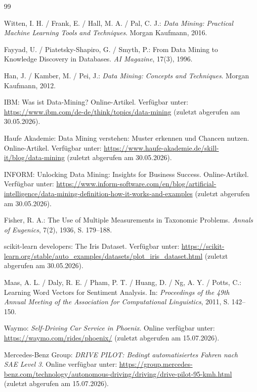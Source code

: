\documentclass[12pt,a4paper]{article}
\begin{document}
\begin{thebibliography}{99}

Witten, I. H. / Frank, E. / Hall, M. A. / Pal, C. J.:
\textit{Data Mining: Practical Machine Learning Tools and Techniques}.
Morgan Kaufmann, 2016.

Fayyad, U. / Piatetsky-Shapiro, G. / Smyth, P.:
From Data Mining to Knowledge Discovery in Databases.
\textit{AI Magazine}, 17(3), 1996.

Han, J. / Kamber, M. / Pei, J.:
\textit{Data Mining: Concepts and Techniques}.
Morgan Kaufmann, 2012.

IBM:
Was ist Data-Mining?
Online-Artikel.
Verfügbar unter:
\url{https://www.ibm.com/de-de/think/topics/data-mining}
(zuletzt abgerufen am 30.05.2026).

Haufe Akademie:
Data Mining verstehen: Muster erkennen und Chancen nutzen.
Online-Artikel.
Verfügbar unter:
\url{https://www.haufe-akademie.de/skill-it/blog/data-mining}
(zuletzt abgerufen am 30.05.2026).

INFORM:
Unlocking Data Mining: Insights for Business Success.
Online-Artikel.
Verfügbar unter:
\url{https://www.inform-software.com/en/blog/artificial-intelligence/data-mining-definition-how-it-works-and-examples}
(zuletzt abgerufen am 30.05.2026).

Fisher, R. A.:
The Use of Multiple Measurements in Taxonomic Problems.
\textit{Annals of Eugenics}, 7(2), 1936, S. 179--188.

scikit-learn developers:
The Iris Dataset.
Verfügbar unter:
\url{https://scikit-learn.org/stable/auto_examples/datasets/plot_iris_dataset.html}
(zuletzt abgerufen am 30.05.2026).

Maas, A. L. / Daly, R. E. / Pham, P. T. / Huang, D. / Ng, A. Y. / Potts, C.:
Learning Word Vectors for Sentiment Analysis.
In: \textit{Proceedings of the 49th Annual Meeting of the Association for Computational Linguistics},
2011, S. 142--150. 

Waymo:
\textit{Self-Driving Car Service in Phoenix}.
Online verfügbar unter:
\url{https://waymo.com/rides/phoenix/}
(zuletzt abgerufen am 15.07.2026).

Mercedes-Benz Group:
\textit{DRIVE PILOT: Bedingt automatisiertes Fahren nach SAE Level 3}.
Online verfügbar unter:
\url{https://group.mercedes-benz.com/technology/autonomous-driving/driving/drive-pilot-95-kmh.html}
(zuletzt abgerufen am 15.07.2026).


\end{thebibliography}
\end{document}
